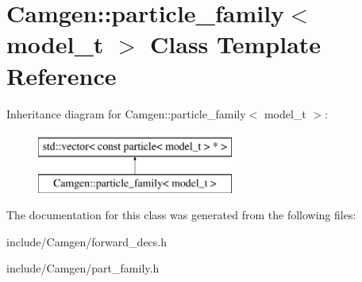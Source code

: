 \hypertarget{a00403}{}\section{Camgen\+:\+:particle\+\_\+family$<$ model\+\_\+t $>$ Class Template Reference}
\label{a00403}
Inheritance diagram for Camgen\+:\+:particle\+\_\+family$<$ model\+\_\+t $>$\+:\begin{figure}[H]
\begin{center}
\leavevmode
\includegraphics[height=2.000000cm]{a00403}
\end{center}
\end{figure}


The documentation for this class was generated from the following files\+:\begin{DoxyCompactItemize}
\item 
include/\+Camgen/forward\+\_\+decs.\+h\item 
include/\+Camgen/part\+\_\+family.\+h\end{DoxyCompactItemize}
